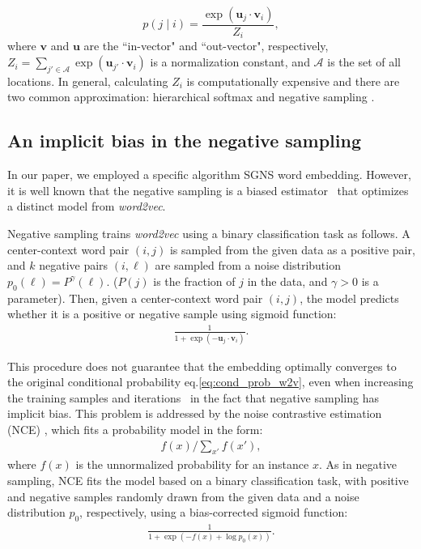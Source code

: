 \documentclass[12pt,a4paper]{article}
\def\given{\mid}
\begin{document}
%
%
\begin{equation}
	p(j \given i) = \frac{\exp(\bm{u}_j \cdot \bm{v}_{i})}{Z_i}, \label{eq:cond_prob_w2v}
\end{equation}
where $\bm{v}$ and $\bm{u}$ are the ``in-vector" and ``out-vector", respectively,  $Z_i=\sum_{j' \in \mathcal{A}} \exp(\bm{u}_{j'} \cdot \bm{v}_{i})$ is a normalization constant, and $\mathcal{A}$ is the set of all locations. In general, calculating $Z_i$ is computationally expensive and there are two common approximation: 
 hierarchical softmax \autocite{morin2005hierarchical} and negative sampling \autocite{mikolov2013word2vec}.


\subsection{An implicit bias in the negative sampling}

In our paper, we employed a specific algorithm SGNS word embedding. However, it is well known that the negative sampling is a biased estimator~\autocite{Chia2010,Dyer2014} that optimizes a distinct model  from {\it word2vec}.

Negative sampling trains {\it word2vec} using a binary classification task as follows.
A center-context word pair $(i,j)$ is sampled from the given data as a positive pair, and $k$ negative pairs $(i,\ell)$ are sampled from a noise distribution $p_0(\ell)=P^\gamma(\ell)$. ($P(j)$ is the fraction of $j$ in the data, and $\gamma>0$ is a parameter).
Then, given a center-context word pair $(i,j)$, the model predicts whether it is a positive or negative sample using sigmoid function:
\begin{align}
	\label{eq:sigmoid}
	\frac{1}{1 + \exp\left( - \bm{u}_j \cdot \bm{v}_i \right)}.
\end{align}

This procedure does not guarantee that the embedding optimally converges to the original conditional probability eq.\ref{eq:cond_prob_w2v}, even when increasing the training samples and iterations~\autocite{Chia2010,Dyer2014} in the fact that negative sampling has implicit bias.
This problem is addressed by the noise contrastive estimation (NCE) \autocite{Chia2010}, which fits a probability model in the form:
\begin{align}
	\label{eq:nce}
	f(x) / \sum_{x'} f(x'),
\end{align}
where $f(x)$ is the unnormalized probability for an instance $x$. As in negative sampling, NCE fits the model based on a binary classification task, with positive and negative samples randomly drawn from the given data and a noise distribution $p_0$, respectively, using a bias-corrected sigmoid function:
\begin{align}
	\label{eq:sigmoid2}
	\frac{1}{1 + \exp\left( -f(x) + \log p_0(x) \right)}.
\end{align}
\end{document}
